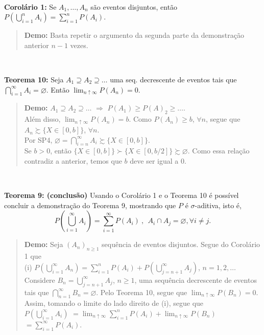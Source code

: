 \documentclass[
]{book}
\begin{document}
\(~\)

\textbf{Corolário 1:} Se \(A_1, \ldots, A_n\) são eventos disjuntos, então \(P\left(\bigcup_{i=1}^{n} A_i\right) = \sum_{i=1}^{n} P\left(A_i\right)\).

\begin{quote}
\textbf{Demo:} Basta repetir o argumento da segunda parte da demonstração anterior \(n-1\) vezes.
\end{quote}

\(~\)

\textbf{Teorema 10:} Seja \(A_1 \supseteq A_2 \supseteq \ldots\) uma seq. decrescente de eventos tais que \(\bigcap_{i=1}^{\infty} A_i = \varnothing\). Então \(\displaystyle \lim_{n \uparrow \infty} P(A_n) = 0\).

\begin{quote}
\textbf{Demo:} \(A_1 \supseteq A_2 \supseteq \ldots\) \(\Rightarrow\) \(P(A_1) \geq P(A)_2 \geq \ldots\).\\
Além disso, \(\displaystyle \lim_{n \uparrow \infty} P(A_n) = b\). Como \(P(A_n) \geq b\), \(\forall n\), segue que \(A_n \succsim \{X \in [0,b]\}\), \(\forall n\).\\
Por SP4, \(\varnothing = \bigcap_{i=n}^{\infty} A_i \succsim \{X \in [0,b]\}\).\\
Se \(b>0\), então \(\{X \in [0,b]\} \succ \{X \in [0,b/2]\} \succsim \varnothing\). Como essa relação contradiz a anterior, temos que \(b\) deve ser igual a \(0\).
\end{quote}

\(~\)

\textbf{Teorema 9: (conclusão)}
Usando o Corolário 1 e o Teorema 10 é possível concluir a demonstração do Teorema 9, mostrando que \(P\) é \(\sigma\)-aditiva, isto é, \[P\left(\bigcup_{i=1}^{\infty} A_i\right) = \sum_{i=1}^{\infty} P\left(A_i\right) ~,~~ A_i \cap A_j = \varnothing, \forall i \neq j.\]

\begin{quote}
\textbf{Demo:} Seja \((A_n)_{n \geq 1}\) sequência de eventos disjuntos. Segue do Corolário 1 que\\
(i) \(\displaystyle P\left(\bigcup_{i=1}^{\infty} A_n\right) = \sum_{i=1}^{n} P\left(A_i\right) + P\left(\bigcup_{j=n+1}^{\infty} A_j\right)\), \(n=1,2,\ldots\)\\
Considere \(\displaystyle B_n=\bigcup_{j=n+1}^{\infty} A_j\), \(n \geq 1\), uma sequência decrescente de eventos tais que \(\displaystyle \bigcap_{n=1}^{\infty} B_n = \varnothing\). Pelo Teorema 10, segue que \(\displaystyle \lim_{n\uparrow \infty} P(B_n) = 0\). Assim, tomando o limite do lado direito de (i), segue que\\
\(\displaystyle P\left(\bigcup_{i=1}^{\infty} A_i\right)\) \(=\displaystyle \lim_{n\uparrow \infty} \sum_{i=1}^{n} P\left(A_i\right) + \lim_{n\uparrow \infty} P\left(B_n\right)\) \(=\displaystyle \sum_{i=1}^{\infty} P\left(A_i\right)\).
\end{quote}
\end{document}

